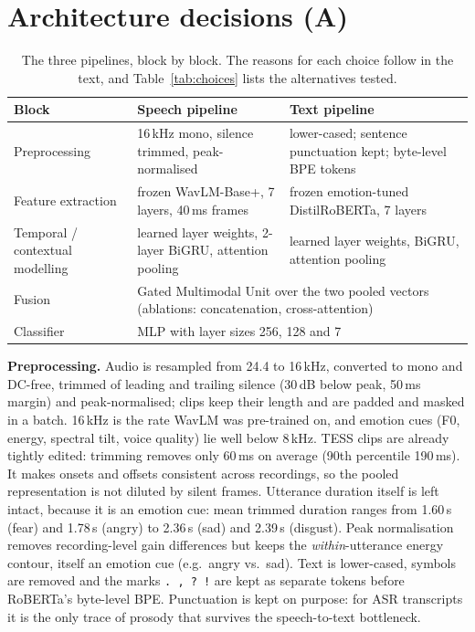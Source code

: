 \section{Architecture decisions (A)}\label{sec:arch}
\begin{table}[H]\centering\small
\caption[The three pipelines, block by block]{The three pipelines, block by block. The reasons for each choice follow in the text, and Table~\ref{tab:choices} lists the alternatives tested.}\label{tab:arch}
\renewcommand{\arraystretch}{1.25}
\begin{tabularx}{\linewidth}{@{}p{3.1cm}XX@{}}\toprule
Block & Speech pipeline & Text pipeline\\\midrule
Preprocessing & 16\,kHz mono, silence trimmed, peak-normalised & lower-cased; sentence punctuation kept; byte-level BPE tokens\\
Feature extraction & frozen WavLM-Base+, 7 layers, 40\,ms frames & frozen emotion-tuned DistilRoBERTa, 7 layers\\
Temporal / contextual modelling & learned layer weights, 2-layer BiGRU, attention pooling & learned layer weights, BiGRU, attention pooling\\
Fusion & \multicolumn{2}{l}{Gated Multimodal Unit over the two pooled vectors (ablations: concatenation, cross-attention)}\\
Classifier & \multicolumn{2}{l}{MLP with layer sizes 256, 128 and 7}\\\bottomrule
\end{tabularx}\end{table}

\textbf{Preprocessing.} Audio is resampled from 24.4 to 16\,kHz, converted to mono and DC-free, trimmed of leading and trailing silence (30\,dB below peak, 50\,ms margin) and peak-normalised; clips keep their length and are padded and masked in a batch. 16\,kHz is the rate WavLM was pre-trained on, and emotion cues (F0, energy, spectral tilt, voice quality) lie well below 8\,kHz.
TESS clips are already tightly edited: trimming removes only 60\,ms on average (90th percentile 190\,ms). It makes onsets and offsets consistent across recordings, so the pooled representation is not diluted by silent frames. Utterance duration itself is left intact, because it is an emotion cue: mean trimmed duration ranges from 1.60\,s (fear) and 1.78\,s (angry) to 2.36\,s (sad) and 2.39\,s (disgust).
Peak normalisation removes recording-level gain differences but keeps the \emph{within}-utterance energy contour, itself an emotion cue (e.g.\ angry vs.\ sad).
Text is lower-cased, symbols are removed and the marks \texttt{. , ? !} are kept as separate tokens before RoBERTa's byte-level BPE. Punctuation is kept on purpose: for ASR transcripts it is the only trace of prosody that survives the speech-to-text bottleneck.


